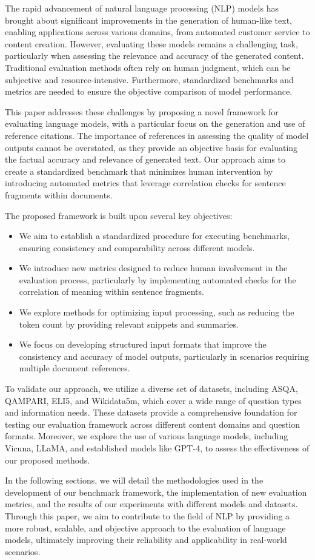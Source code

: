 The rapid advancement of natural language processing (NLP) models has brought about significant improvements in the generation of human-like text, enabling applications across various domains, from automated customer service to content creation. However, evaluating these models remains a challenging task, particularly when assessing the relevance and accuracy of the generated content. Traditional evaluation methods often rely on human judgment, which can be subjective and resource-intensive. Furthermore, standardized benchmarks and metrics are needed to ensure the objective comparison of model performance.

This paper addresses these challenges by proposing a novel framework for evaluating language models, with a particular focus on the generation and use of reference citations. The importance of references in assessing the quality of model outputs cannot be overstated, as they provide an objective basis for evaluating the factual accuracy and relevance of generated text. Our approach aims to create a standardized benchmark that minimizes human intervention by introducing automated metrics that leverage correlation checks for sentence fragments within documents.

The proposed framework is built upon several key objectives:
\begin{itemize}
\item We aim to establish a standardized procedure for executing benchmarks, ensuring consistency and comparability across different models.
\item We introduce new metrics designed to reduce human involvement in the evaluation process, particularly by implementing automated checks for the correlation of meaning within sentence fragments.
\item We explore methods for optimizing input processing, such as reducing the token count by providing relevant snippets and summaries.
\item We focus on developing structured input formats that improve the consistency and accuracy of model outputs, particularly in scenarios requiring multiple document references.
\end{itemize}

To validate our approach, we utilize a diverse set of datasets, including ASQA, QAMPARI, ELI5, and Wikidata5m, which cover a wide range of question types and information needs. These datasets provide a comprehensive foundation for testing our evaluation framework across different content domains and question formats. Moreover, we explore the use of various language models, including Vicuna, LLaMA, and established models like GPT-4, to assess the effectiveness of our proposed methods.

In the following sections, we will detail the methodologies used in the development of our benchmark framework, the implementation of new evaluation metrics, and the results of our experiments with different models and datasets. Through this paper, we aim to contribute to the field of NLP by providing a more robust, scalable, and objective approach to the evaluation of language models, ultimately improving their reliability and applicability in real-world scenarios.